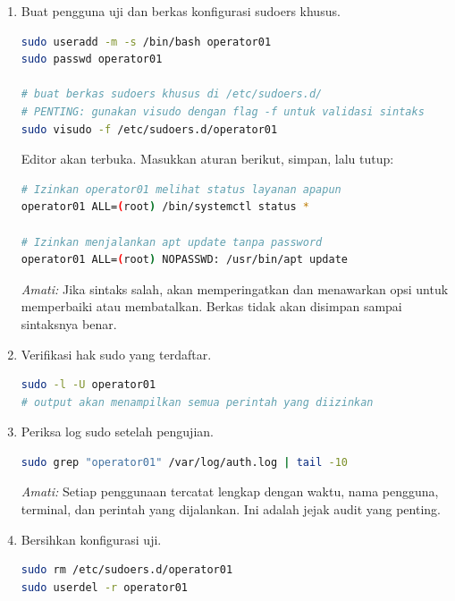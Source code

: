 \begin{enumerate}
    \item Buat pengguna uji dan berkas konfigurasi sudoers khusus.
\begin{lstlisting}[language=bash, caption={Persiapan pengguna dan konfigurasi sudo}]
sudo useradd -m -s /bin/bash operator01
sudo passwd operator01

# buat berkas sudoers khusus di /etc/sudoers.d/
# PENTING: gunakan visudo dengan flag -f untuk validasi sintaks
sudo visudo -f /etc/sudoers.d/operator01
\end{lstlisting}

    Editor akan terbuka. Masukkan aturan berikut, simpan, lalu tutup:

\begin{lstlisting}[language=bash, caption={Isi konfigurasi sudo untuk operator01}]
# Izinkan operator01 melihat status layanan apapun
operator01 ALL=(root) /bin/systemctl status *

# Izinkan menjalankan apt update tanpa password
operator01 ALL=(root) NOPASSWD: /usr/bin/apt update
\end{lstlisting}

    \textit{Amati:} Jika sintaks salah,  akan memperingatkan dan menawarkan opsi untuk memperbaiki atau membatalkan. Berkas tidak akan disimpan sampai sintaksnya benar.

    \item Verifikasi hak sudo yang terdaftar.
\begin{lstlisting}[language=bash, caption={Verifikasi aturan sudo}]
sudo -l -U operator01
# output akan menampilkan semua perintah yang diizinkan
\end{lstlisting}

    \item Periksa log sudo setelah pengujian.
\begin{lstlisting}[language=bash, caption={Memeriksa log aktivitas sudo}]
sudo grep "operator01" /var/log/auth.log | tail -10
\end{lstlisting}

    \textit{Amati:} Setiap penggunaan  tercatat lengkap dengan waktu, nama pengguna, terminal, dan perintah yang dijalankan. Ini adalah jejak audit yang penting.

    \item Bersihkan konfigurasi uji.
\begin{lstlisting}[language=bash, caption={Hapus konfigurasi uji}]
sudo rm /etc/sudoers.d/operator01
sudo userdel -r operator01
\end{lstlisting}
\end{enumerate}

